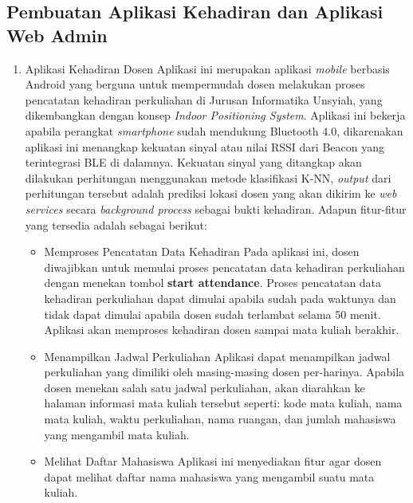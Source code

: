 \subsection{Pembuatan Aplikasi Kehadiran dan Aplikasi Web Admin}
\begin{enumerate}

\item Aplikasi Kehadiran Dosen
\newline
Aplikasi ini merupakan aplikasi \textit{mobile} berbasis Android yang berguna untuk mempermudah dosen melakukan proses pencatatan kehadiran perkuliahan di Jurusan Informatika Unsyiah, yang dikembangkan dengan konsep \textit{Indoor Positioning System}. Aplikasi ini bekerja apabila perangkat \textit{smartphone} sudah mendukung Bluetooth 4.0, dikarenakan aplikasi ini menangkap kekuatan sinyal atau nilai RSSI dari Beacon yang terintegrasi BLE di dalamnya. Kekuatan sinyal yang ditangkap akan dilakukan perhitungan menggunakan metode klasifikasi K-NN, \textit{output} dari perhitungan tersebut adalah prediksi lokasi dosen yang akan dikirim ke \textit{web services} secara \textit{background process} sebagai bukti kehadiran. Adapun fitur-fitur yang tersedia adalah sebagai berikut:

\begin {itemize}
\itemsep0em
\item Memproses Pencatatan Data Kehadiran \newline
Pada aplikasi ini, dosen diwajibkan untuk memulai proses pencatatan data kehadiran perkuliahan dengan menekan tombol \textbf{start attendance}. Proses pencatatan data kehadiran perkuliahan dapat dimulai apabila sudah pada waktunya dan tidak dapat dimulai apabila dosen sudah terlambat selama 50 menit. Aplikasi akan memproses kehadiran dosen sampai mata kuliah berakhir.

\item Menampilkan Jadwal Perkuliahan \newline
Aplikasi dapat menampilkan jadwal perkuliahan yang dimiliki oleh masing-masing dosen per-harinya. Apabila dosen menekan salah satu jadwal perkuliahan, akan diarahkan ke halaman informasi mata kuliah tersebut seperti: kode mata kuliah, nama mata kuliah, waktu perkuliahan, nama ruangan, dan jumlah mahasiswa yang mengambil mata kuliah.

\item Melihat Daftar Mahasiswa \newline
Aplikasi ini menyediakan fitur agar dosen dapat melihat daftar nama mahasiswa yang mengambil suatu mata kuliah. 


\end{itemize}
\end{enumerate}
